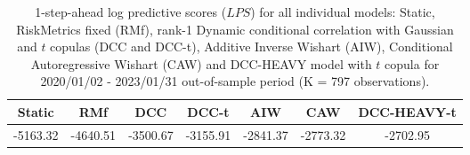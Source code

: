 \begin{table}[ht]
\centering
\caption{1-step-ahead log predictive scores ($LPS$) 
             for all individual models: Static, RiskMetrics fixed (RMf),
rank-1 Dynamic conditional correlation with Gaussian and $t$ copulas (DCC
and DCC-t), Additive Inverse Wishart (AIW), Conditional Autoregressive Wishart (CAW)
and DCC-HEAVY model with $t$ copula for 
2020/01/02 - 2023/01/31 out-of-sample period
(K = 797 observations).} 
\label{table:lps_FX}
\begin{tabular}{ccccccc}
  \hline
Static & RMf & DCC & DCC-t & AIW & CAW & DCC-HEAVY-t \\ 
  \hline
-5163.32 & -4640.51 & -3500.67 & -3155.91 & -2841.37 & -2773.32 & -2702.95 \\ 
   \hline
\end{tabular}
\end{table}
